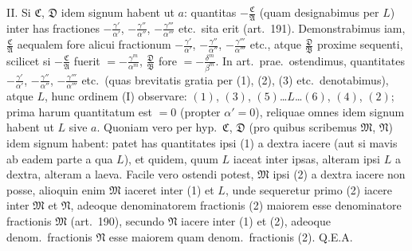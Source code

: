 \documentclass[12pt,a4paper]{article}
\theoremstyle{plain}
\begin{document}
II. Si $\mathfrak{C}$, $\mathfrak{D}$ idem signum habent ut $a$: quantitas $-\frac{\mathfrak{C}}{\mathfrak{A}}$ (quam designabimus per $L$) inter has fractiones $-\frac{\gamma'}{\alpha'}$, $-\frac{\gamma''}{\alpha''}$, $-\frac{\gamma'''}{\alpha'''}$ etc.~sita erit (art.~191). Demonstrabimus iam, $\frac{\mathfrak{C}}{\mathfrak{A}}$ aequalem fore alicui fractionum $-\frac{\gamma'}{\alpha'}$, $-\frac{\gamma''}{\alpha''}$, $-\frac{\gamma'''}{\alpha'''}$ etc., atque $\frac{\mathfrak{D}}{\mathfrak{B}}$ proxime sequenti, scilicet si $-\frac{\mathfrak{C}}{\mathfrak{A}}$ fuerit $= -\frac{\gamma^m}{\alpha^m}$, $\frac{\mathfrak{D}}{\mathfrak{B}}$ fore $= -\frac{\delta^m}{\beta^m}$. In art.~prae.~ostendimus, quantitates $-\frac{\gamma'}{\alpha'}$, $-\frac{\gamma''}{\alpha''}$, $-\frac{\gamma'''}{\alpha'''}$ etc.~(quas brevitatis gratia per (1), (2), (3) etc.~denotabimus), atque $L$, hunc ordinem (I) observare: $(1)$, $(3)$, $(5)$\ldots$L$\ldots$(6)$, $(4)$, $(2)$; prima harum quantitatum est $= 0$ (propter $\alpha' = 0$), reliquae omnes idem signum habent ut $L$ sive $a$. Quoniam vero per hyp.~$\mathfrak{C}$, $\mathfrak{D}$ (pro quibus scribemus $\mathfrak{M}$, $\mathfrak{N}$) idem signum habent: patet has quantitates ipsi (1) a dextra iacere (aut si mavis ab eadem parte a qua $L$), et quidem, quum $L$ iaceat inter ipsas, alteram ipsi $L$ a dextra, alteram a laeva. Facile vero ostendi potest, $\mathfrak{M}$ ipsi (2) a dextra iacere non posse, alioquin enim $\mathfrak{M}$ iaceret inter (1) et $L$, unde sequeretur primo (2) iacere inter $\mathfrak{M}$ et $\mathfrak{N}$, adeoque denominatorem fractionis (2) maiorem esse denominatore fractionis $\mathfrak{M}$ (art.~190), secundo $\mathfrak{N}$ iacere inter (1) et (2), adeoque denom.~fractionis $\mathfrak{N}$ esse maiorem quam denom.~fractionis (2). Q.E.A.
\end{document}
